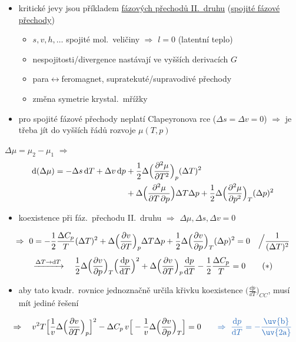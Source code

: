 \begin{itemize}
  \item kritické jevy jsou příkladem \underline{fázových přechodů II.\ druhu} (\underline{spojité fázové přechody})
  \begin{itemize}[nosep]
    \item[--] $s,v,h,\dots$ spojité mol.\ veličiny $\Rightarrow$ $l = 0$ (latentní teplo)
    \item[--] nespojitosti/divergence nastávají ve vyšších derivacích $G$
    \item[--] para$\leftrightarrow$feromagnet, supratekuté/supravodivé přechody
    \item[--] změna symetrie krystal.\ mřížky
  \end{itemize}
  \item pro spojité fázové přechody neplatí Clapeyronova rce ($\Delta s = \Delta v = 0$) $\Rightarrow$ je třeba jít do vyšších řádů rozvoje $\mu(T,p)$
\end{itemize}
$\Delta\mu = \mu_2 - \mu_1$ $\Rightarrow$
\begin{align*}
  \dd(\Delta\mu) = -\Delta s\,\dd T + \Delta v\,\dd p &+ \frac12\Delta\Big(\pdv[2]{\mu}{T}\Big)_p(\Delta T)^2 \\
  &+ \Delta\Big(\frac{\partial^2\mu}{\partial T\,\partial p}\Big)\Delta T\Delta p + \frac12\Delta\Big(\pdv[2]{\mu}{p}\Big)_T(\Delta p)^2
\end{align*}
\begin{itemize}
  \item koexistence při fáz.\ přechodu II.\ druhu $\Rightarrow$ $\Delta\mu,\Delta s,\Delta v = 0$
\end{itemize}
\[
  \Rightarrow\ 0 = -\frac12\frac{\Delta C_p}{T}(\Delta T)^2 + \Delta\Big(\pdv{v}{T}\Big)_p\Delta T\Delta p + \frac12\Delta\Big(\pdv{v}{p}\Big)_T(\Delta p)^2 = 0 \quad \Big/\frac{1}{(\Delta T)^2}
\]
\[
  \xrightarrow{\Delta T\to\dd T}\quad \frac12\Delta\Big(\pdv{v}{p}\Big)_T\Big(\frac{\dd p}{\dd T}\Big)^2 + \Delta\Big(\pdv{v}{T}\Big)_p\frac{\dd p}{\dd T} - \frac12\frac{\Delta C_p}{T} = 0 \qquad (*)
\]
\begin{itemize}
  \item aby tato kvadr.\ rovnice jednoznačně určila křivku koexistence $\big(\frac{\dd p}{\dd T}\big)_{CC}$, musí mít jediné řešení
\end{itemize}
\[
  \Rightarrow\quad v^2T\Big[\frac1v\Delta\Big(\pdv{v}{T}\Big)_p\Big]^2 - \Delta C_p\,v\Big[-\frac1v\Delta\Big(\pdv{v}{p}\Big)_T\Big] = 0
  \qquad {\color{NavyBlue}\Rightarrow\ \frac{\dd p}{\dd T} = -\frac{\text{\uv{b}}}{\text{\uv{2a}}}}
\]

